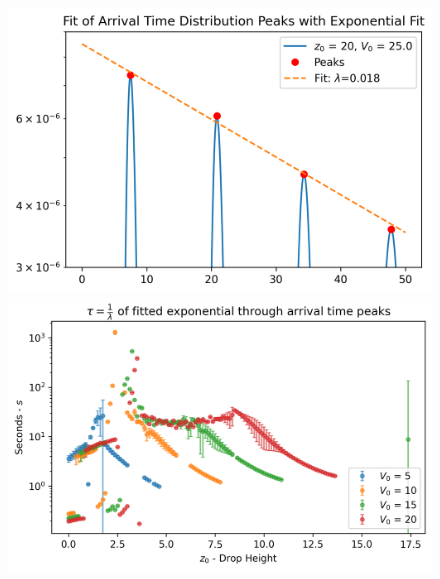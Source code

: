 \begin{figure}
    \centering
    \includegraphics[width=1\linewidth]{Figures//Yoshida/7d9ebeb9-8c0c-45c8-a44b-739e39178c7e.png}
    \includegraphics[width=1\linewidth]{Figures//Yoshida/0c0a8ea4-42db-4ad1-b609-e2cd504f8f1d.png}


\end{figure}
